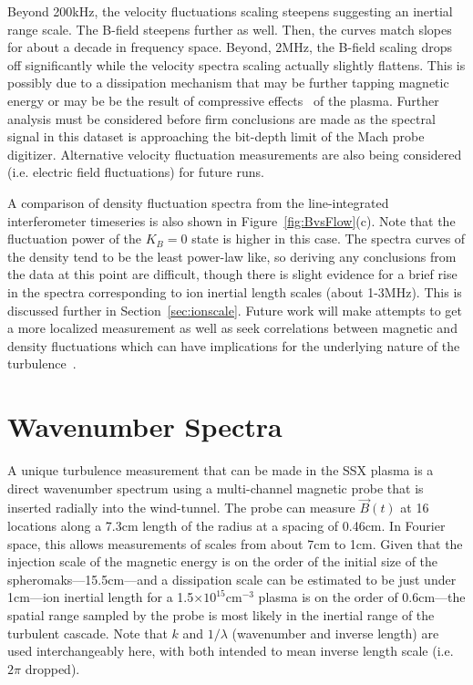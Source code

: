 \documentclass[aip,prl,amsmath,amssymb,reprint,superscriptaddress]{revtex4-1} %
\begin{document}
Beyond 200kHz, the velocity fluctuations scaling steepens suggesting an inertial range scale. The B-field steepens further as well. Then, the curves match slopes for about a decade in frequency space. Beyond, 2MHz, the B-field scaling drops off significantly while the velocity spectra scaling actually slightly flattens. This is possibly due to a dissipation mechanism that may be further tapping magnetic energy or may be be the result of compressive effects~\cite{roberts10} of the plasma. Further analysis must be considered before firm conclusions are made as the spectral signal in this dataset is approaching the bit-depth limit of the Mach probe digitizer. Alternative velocity fluctuation measurements are also being considered (i.e. electric field fluctuations) for future runs.

A comparison of density fluctuation spectra from the line-integrated interferometer timeseries is also shown in Figure~\ref{fig:BvsFlow}(c). Note that the fluctuation power of the $K_{B}=0$ state is higher in this case. The spectra curves of the density tend to be the least power-law like, so deriving any conclusions from the data at this point are difficult, though there is slight evidence for a brief rise in the spectra corresponding to ion inertial length scales (about 1-3MHz). This is discussed further in Section~\ref{sec:ionscale}. Future work will make attempts to get a more localized measurement as well as seek correlations between magnetic and density fluctuations which can have implications for the underlying nature of the turbulence~\cite{klein12}.

\section{Wavenumber Spectra}\label{sec:wavenumber}

A unique turbulence measurement that can be made in the SSX plasma is a direct wavenumber spectrum using a multi-channel magnetic probe that is inserted radially into the wind-tunnel. The probe can measure $\vec{B}(t)$ at 16 locations along a 7.3cm length of the radius at a spacing of 0.46cm. In Fourier space, this allows measurements of scales from about 7cm to 1cm. Given that the injection scale of the magnetic energy is on the order of the initial size of the spheromaks---15.5cm---and a dissipation scale can be estimated to be just under 1cm---ion inertial length for a 1.5$\times 10^{15}$cm$^{-3}$ plasma is on the order of 0.6cm---the spatial range sampled by the probe is most likely in the inertial range of the turbulent cascade. Note that $k$ and $1/\lambda$ (wavenumber and inverse length) are used interchangeably here, with both intended to mean inverse length scale (i.e. $2\pi$ dropped).
\end{document}

